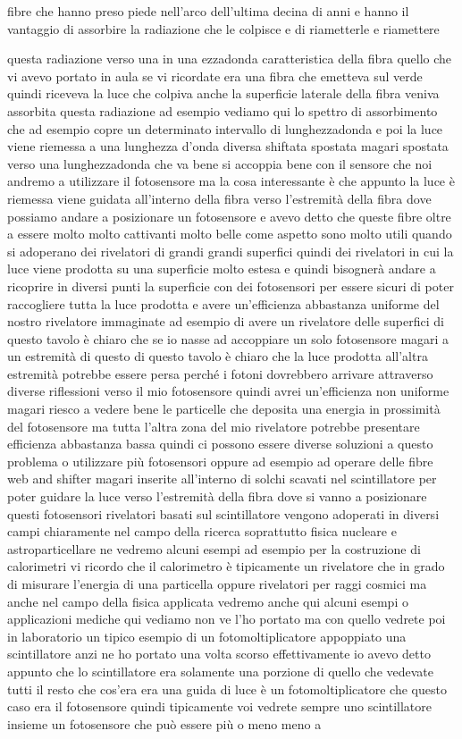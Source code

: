 {fibre che hanno preso piede nell'arco dell'ultima decina di anni e hanno il vantaggio di assorbire la radiazione che le colpisce e di riametterle e riamettere

questa radiazione verso una in una ezzadonda caratteristica della fibra quello che vi avevo portato in aula se vi ricordate era una fibra che emetteva sul verde quindi riceveva la luce che colpiva anche la superficie laterale della fibra veniva assorbita questa radiazione ad esempio vediamo qui lo spettro di assorbimento che ad esempio copre un determinato intervallo di lunghezzadonda e poi la luce viene riemessa a una lunghezza d'onda diversa shiftata spostata magari spostata verso una lunghezzadonda che va bene si accoppia bene con il sensore che noi andremo a utilizzare il fotosensore ma la cosa interessante è che appunto la luce è riemessa viene guidata all'interno della fibra verso l'estremità della fibra dove possiamo andare a posizionare un fotosensore e avevo detto che queste fibre oltre a essere molto molto cattivanti molto belle come aspetto sono molto utili quando si adoperano dei rivelatori di grandi grandi superfici quindi dei rivelatori in cui la luce viene prodotta su una superficie molto estesa e quindi bisognerà andare a ricoprire in diversi punti la superficie con dei fotosensori per essere sicuri di poter raccogliere tutta la luce prodotta e avere un'efficienza abbastanza uniforme del nostro rivelatore immaginate ad esempio di avere un rivelatore delle superfici di questo tavolo è chiaro che se io nasse ad accoppiare un solo fotosensore magari a un estremità di questo di questo tavolo è chiaro che la luce prodotta all'altra estremità potrebbe essere persa perché i fotoni dovrebbero arrivare attraverso diverse riflessioni verso il mio fotosensore quindi avrei un'efficienza non uniforme magari riesco a vedere bene le particelle che deposita una energia in prossimità del fotosensore ma tutta l'altra zona del mio rivelatore potrebbe presentare efficienza abbastanza bassa quindi ci possono essere diverse soluzioni a questo problema o utilizzare più fotosensori oppure ad esempio ad operare delle fibre web and shifter magari inserite all'interno di solchi scavati nel scintillatore per poter guidare la luce verso l'estremità della fibra dove si vanno a posizionare questi fotosensori rivelatori basati sul scintillatore vengono adoperati in diversi campi chiaramente nel campo della ricerca soprattutto fisica nucleare e astroparticellare ne vedremo alcuni esempi ad esempio per la costruzione di calorimetri vi ricordo che il calorimetro è tipicamente un rivelatore che in grado di misurare l'energia di una particella oppure rivelatori per raggi cosmici ma anche nel campo della fisica applicata vedremo anche qui alcuni esempi o applicazioni mediche qui vediamo non ve l'ho portato ma con quello vedrete poi in laboratorio un tipico esempio di un fotomoltiplicatore appoppiato una scintillatore anzi ne ho portato una volta scorso effettivamente io avevo detto appunto che lo scintillatore era solamente una porzione di quello che vedevate tutti il resto che cos'era era una guida di luce è un fotomoltiplicatore che questo caso era il fotosensore quindi tipicamente voi vedrete sempre uno scintillatore insieme un fotosensore che può essere più o meno meno a }
